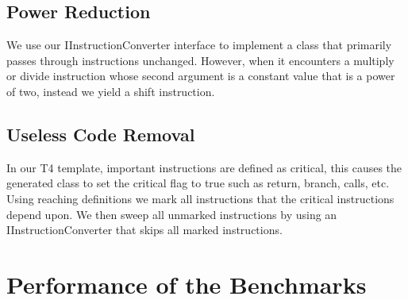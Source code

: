 \documentclass[12pt]{article}
\begin{document}
\subsection{Power Reduction}
We use our IInstructionConverter interface to implement a class that primarily passes through instructions unchanged.
However, when it encounters a multiply or divide instruction whose second argument is a constant value that is a power of two, instead we yield a shift instruction.
\subsection{Useless Code Removal}
In our T4 template, important instructions are defined as critical, this causes the generated class to set the critical flag to true such as return, branch, calls, etc.
Using reaching definitions we mark all instructions that the critical instructions depend upon.
We then sweep all unmarked instructions by using an IInstructionConverter that skips all marked instructions.
\section{Performance of the Benchmarks}
  
\end{document}
